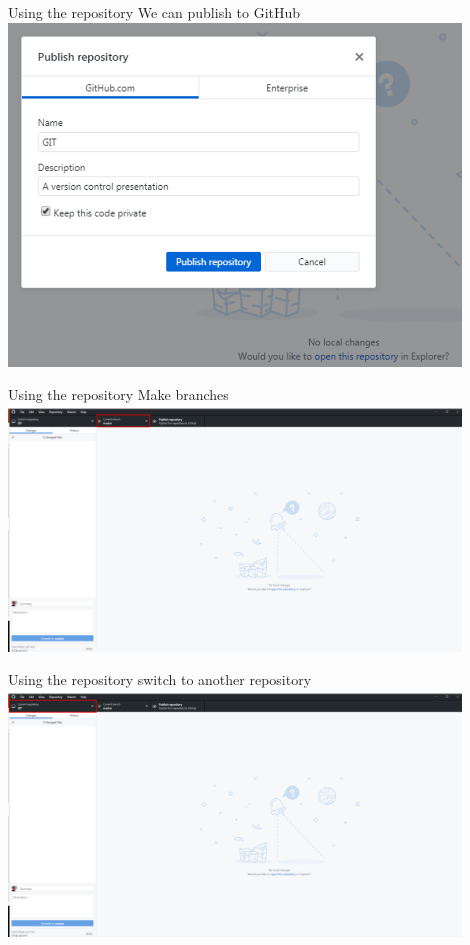 \documentclass[10pt]{beamer}
\begin{document}
{\begin{frame}[fragile]{Using the repository}
\small We can publish to GitHub
\includegraphics[width=12cm]{Figs/GHD/init_00}
\end{frame}

\begin{frame}[fragile]{Using the repository}
\small Make branches
\includegraphics[width=12cm]{Figs/GHD/outline_04}
\end{frame}

\begin{frame}[fragile]{Using the repository}
\small switch to another repository
\includegraphics[width=12cm]{Figs/GHD/outline_05}
\end{frame}

}
\end{document}
